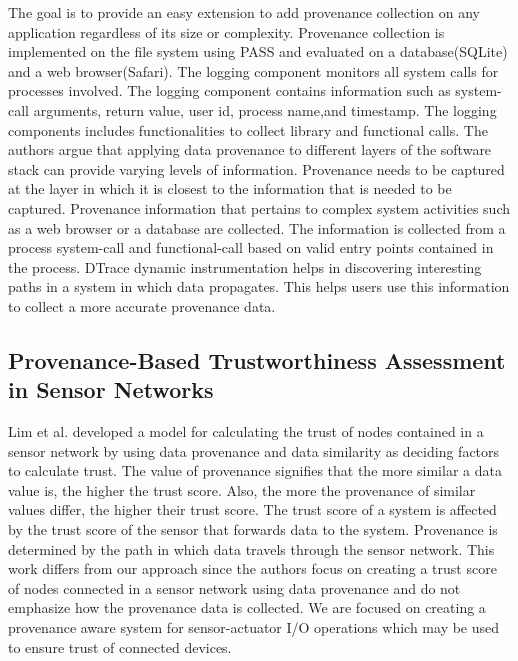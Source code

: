 The goal is to provide an easy extension to add provenance collection on any application regardless of its size or complexity. Provenance collection is implemented on the file system using PASS and evaluated on a database(SQLite) and a web browser(Safari). 
The logging component monitors all system calls for processes involved. The logging component contains information such as system-call arguments, return value, user id, process name,and timestamp. The logging components includes functionalities to collect library and functional calls. The authors argue that applying data provenance to different layers of the software stack can provide varying levels of information. Provenance needs to be captured at the layer in which it is closest to the information that is needed to be captured. Provenance information that pertains to complex system activities such as a web browser or a database are collected. The information is collected from a process system-call and functional-call based on valid entry points contained in the process. DTrace dynamic instrumentation helps in discovering interesting paths in a system in which data propagates. This helps users use this information to collect a more accurate provenance data.


\subsection{Provenance-Based Trustworthiness Assessment in Sensor Networks}
Lim et al. \cite{lim} developed a
model for calculating the trust of nodes contained in a sensor network by using data
provenance and data similarity as deciding factors to calculate trust. The value of
provenance signifies that the more similar a data value is, the higher the trust score.
Also, the more the provenance of similar values differ, the higher their trust score. The trust score of a system is affected by the trust score of the sensor that forwards data to the system. Provenance is determined by the path in which data travels through the sensor network. This work differs from our approach since the authors focus on creating a trust score
of nodes connected in a sensor network using data provenance and do not emphasize
how the provenance data is collected. We are focused on creating a
provenance aware system for sensor-actuator I/O operations which may be used to ensure trust of
connected devices. 

